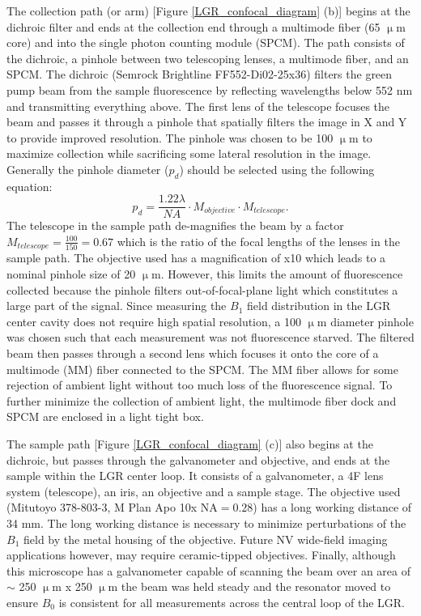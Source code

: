 The collection path (or arm) [Figure \ref{LGR_confocal_diagram} (b)] begins at the dichroic filter and ends at the collection end through a multimode fiber (65 $\upmu$m core) and into the single photon counting module (SPCM). The path consists of the dichroic, a pinhole between two telescoping lenses, a multimode fiber, and an SPCM. The dichroic (Semrock Brightline FF552-Di02-25x36) filters the green pump beam from the sample fluorescence by reflecting wavelengths below 552 nm and transmitting everything above. The first lens of the telescope focuses the beam and passes it through a pinhole that spatially filters the image in X and Y to provide  improved resolution. The pinhole was chosen to be 100 $\upmu$m to maximize collection while sacrificing some lateral resolution in the image. Generally the pinhole diameter ($p_d$) should be selected using the following equation:
\begin{equation}
p_d = \frac{1.22 \lambda}{NA} \cdot M_{objective} \cdot M_{telescope}. 
\end{equation}
The telescope in the sample path de-magnifies the beam by a factor $M_{telescope} = \frac{100}{150} = 0.67$ which is the ratio of the focal lengths of the lenses in the sample path. The objective used has a magnification of x10 which leads to a nominal pinhole size of 20 $\upmu$m. However, this limits the amount of fluorescence collected because the pinhole filters out-of-focal-plane light which constitutes a large part of the signal. Since measuring the $B_1$ field distribution in the LGR center cavity does not require high spatial resolution, a 100 $\upmu$m diameter pinhole was chosen such that each measurement was not fluorescence starved. The filtered beam then passes through a second lens which focuses it onto the core of a multimode (MM) fiber connected to the SPCM. The MM fiber allows for some rejection of ambient light without too much loss of the fluorescence signal. To further minimize the collection of ambient light, the multimode fiber dock and SPCM are enclosed in a light tight box. 

The sample path [Figure \ref{LGR_confocal_diagram} (c)] also begins at the dichroic, but passes through the galvanometer and objective, and ends at the sample within the LGR center loop. It consists of a galvanometer, a 4F lens system (telescope), an iris, an objective and a sample stage. The objective used (Mitutoyo 378-803-3, M Plan Apo 10x $\text{NA}=0.28$) has a long working distance of 34 mm. The long working distance is necessary to minimize perturbations of the $B_1$ field by the metal housing of the objective. Future NV wide-field imaging applications however, may require ceramic-tipped objectives. Finally, although this microscope has a galvanometer capable of scanning the beam over an area of $\sim$ 250 $\upmu$m x 250 $\upmu$m the beam was held steady and the resonator moved to ensure $B_0$ is consistent for all measurements across the central loop of the LGR.


